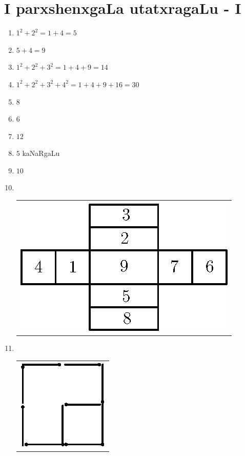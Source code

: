 \chapter{I parxshenxgaLa utatxragaLu - {\rm I}}

\begin{enumerate}
  \renewcommand{\labelenumi}{\rm(\theenumi)}
    \itemsep=2pt
\item $1^2+ 2^2 = 1+4=5$

\item $5+4=9$

\item $1^2+2^2+3^2 = 1+4+9 =14$

\item $1^2 + 2^2 + 3^2+4^2 = 1+4+9+16 = 30$

\item $8$

\item $6$

\item $12$

\item $5$ kaNaRgaLu

\item $10$

\item
  ~

  \vskip -0.4cm
  
  \begin{tabular}[t]{l}
 \includegraphics{src/figures/ans10.eps}
\end{tabular}

  \newpage

\item 
~

  \vskip -0.6cm
  \begin{tabular}[t]{c}
\centering
\includegraphics{src/figures/ans11.eps}
\end{tabular}
\smallskip


\end{enumerate}
